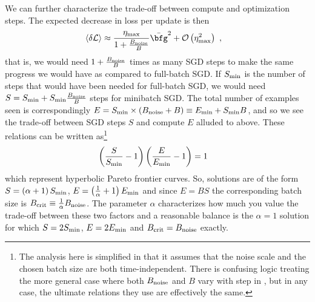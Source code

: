 \documentclass[11pt]{article}
\begin{document}
We can further characterize the trade-off between compute and optimization steps. The expected
decrease in loss per update is then
\begin{align}
\langle \delta \Lcal \rangle  &\approx \frac{ \eta _{ {\rm  max} } }{ 1 + \frac{ B _{ {\rm  noise} } }{ B } } \bar{\bfg } ^{2 } + \Ocal \left( \eta _{ {\rm max} } ^{ 2 } \right) \ ,
\end{align}
that is, we would need $ 1 + \frac{ B _{ {\rm noise} } }{ B } $ times as many SGD steps to make the
same progress we would have as compared to full-batch SGD. If $ S _{ {\rm  min} } $ is the number of
steps that would have been needed for full-batch SGD, we would need $ S=S _{ {\rm  min} } + S _{
{\rm  min} } \frac{ B _{ {\rm noise} } }{ B } $ steps for minibatch SGD.  The total number of
examples seen is correspondingly $ E = S _{ {\rm  min} } \times  \left ( B _{ {\rm  noise} } +B
\right)\equiv E _{ {\rm min} }+ S _{ {\rm  min} }B $, and so we see the trade-off between SGD steps
$ S $ and compute $ E $ alluded to above.  These relations can be written as\footnote{The analysis
here is simplified in that it assumes that the noise scale and the chosen batch size are both
time-independent. There is confusing logic treating the more general case where both
$ B _{ {\rm noise} } $ and $ B $ vary with step in \cite{mccandlish2018empirical}, but in any case,
the ultimate relations they use are effectively the same.}
\begin{align}
    \left ( \frac{ S }{ S _{ {\rm  min} } }-1 \right )\left ( \frac{ E }{ E _{ {\rm min} } }-1 \right ) &=1
\end{align}
which represent hyperbolic Pareto frontier curves. So, solutions are of the form $ S=\left ( \alpha
+1 \right )S _{ {\rm  min} } $, $ E=\left ( \frac{ 1 }{ \alpha  } +1 \right )E _{ {\rm  min} } $
and since $E=BS $ the corresponding batch size is $ B _{ {\rm crit} } \equiv  \frac{ 1 }{ \alpha  }
B _{ {\rm noise} }$. The parameter $ \alpha $ characterizes how much you value the trade-off between
these two factors and a reasonable balance is the $ \alpha =1 $ solution for which $S = 2S _{ {\rm
min} } $, $ E=2E _{ {\rm min} } $ and $ B _{ {\rm crit} }= B _{ {\rm  noise} } $ exactly.
\end{document}
